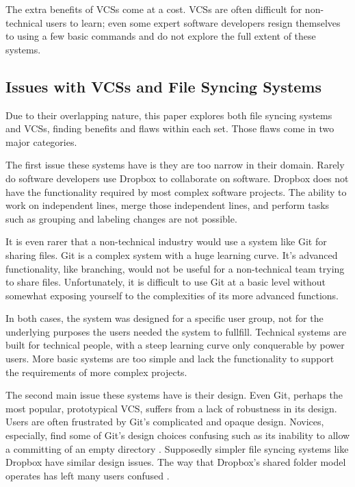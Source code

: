 The extra benefits of VCSs come at a cost. VCSs are often difficult for non-technical users to learn; even some expert software developers resign themselves to using a few basic commands and do not explore the full extent of these systems. 

\subsection{Issues with VCSs and File Syncing Systems}

Due to their overlapping nature, this paper explores both file syncing systems and VCSs, finding benefits and flaws within each set. Those flaws come in two major categories.

The first issue these systems have is they are too narrow in their domain. Rarely do software developers use Dropbox to collaborate on software. Dropbox does not have the functionality required by most complex software projects. The ability to work on independent lines, merge those independent lines, and perform tasks such as grouping and labeling changes are not possible.

It is even rarer that a non-technical industry would use a system like Git for sharing files. Git is a complex system with a huge learning curve. It's advanced functionality, like branching, would not be useful for a non-technical team trying to share files. Unfortunately, it is difficult to use Git at a basic level without somewhat exposing yourself to the complexities of its more advanced functions.

In both cases, the system was designed for a specific user group, not for the underlying purposes the users needed the system to fullfill. Technical systems are built for technical people, with a steep learning curve only conquerable by power users. More basic systems are too simple and lack the functionality to support the requirements of more complex projects.

The second main issue these systems have is their design. Even Git, perhaps the most popular, prototypical VCS, suffers from a lack of robustness in its design. Users are often frustrated by Git's complicated and opaque design. Novices, especially, find some of Git's design choices confusing such as its inability to allow a committing of an empty directory \cite{RossoJackson}. Supposedly simpler file syncing systems like Dropbox have similar design issues. The way that Dropbox's shared folder model operates has left many users confused \cite{Zhang}.

